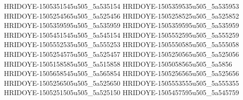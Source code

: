HRIDOYE-1505351545u505_5a535154
HRIDOYE-1505359535u505_5a535953
HRIDOYE-1505254565u505_5a525456
HRIDOYE-1505258525u505_5a525852
HRIDOYE-1505359595u505_5a535959
HRIDOYE-1505359595u505_5a535959
HRIDOYE-1505451545u505_5a545154
HRIDOYE-1505552595u505_5a555259
HRIDOYE-1505552535u505_5a555253
HRIDOYE-1505550585u505_5a555058
HRIDOYE-1505254575u505_5a525457
HRIDOYE-1505250565u505_5a525056
HRIDOYE-1505158585u505_5a515858
HRIDOYE-1505058565u505_5a5856
HRIDOYE-1505658545u505_5a565854
HRIDOYE-1505256565u505_5a525656
HRIDOYE-1505256505u505_5a525650
HRIDOYE-1505553555u505_5a555355
HRIDOYE-1505251505u505_5a525150
HRIDOYE-1505457595u505_5a545759
